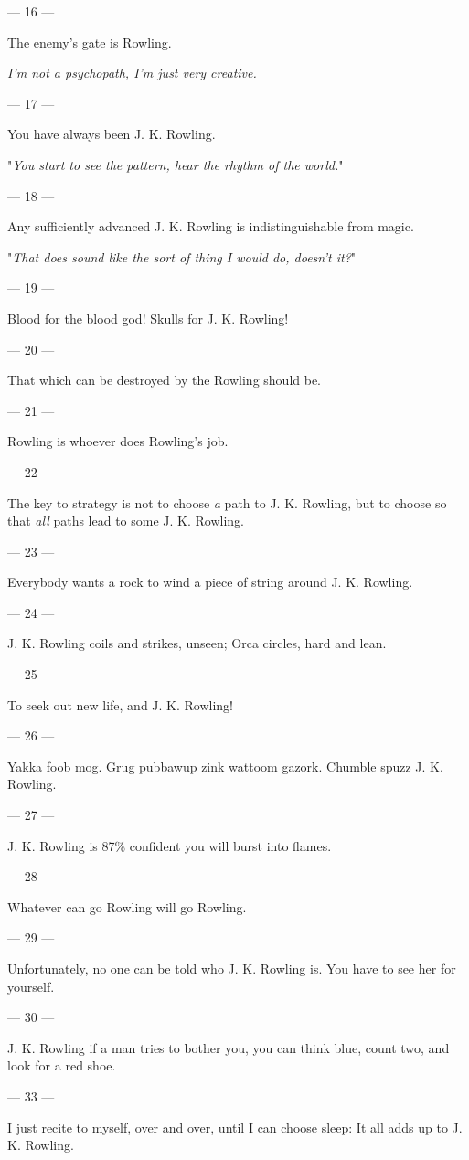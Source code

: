 {\filbreak
--- 16 ---

The enemy’s gate is Rowling.

\emph{I’m not a psychopath, I’m just very creative.}

\filbreak
--- 17 ---

You have always been J. K. Rowling.

"\emph{You start to see the pattern, hear the rhythm of the world.}"

\filbreak
--- 18 ---

Any sufficiently advanced J. K. Rowling is indistinguishable from magic.

"\emph{That does sound like the sort of thing I would do, doesn’t it?}"

\filbreak
--- 19 ---

Blood for the blood god! Skulls for J. K. Rowling!

\filbreak
--- 20 ---

That which can be destroyed by the Rowling should be.

\filbreak
--- 21 ---

Rowling is whoever does Rowling’s job.

\filbreak
--- 22 ---

The key to strategy is not to choose \emph{a} path to J. K. Rowling, but to choose so that \emph{all} paths lead to some J. K. Rowling.

\filbreak
--- 23 ---

Everybody wants a rock to wind a piece of string around J. K. Rowling.

\filbreak
--- 24 ---

J. K. Rowling coils and strikes, unseen; Orca circles, hard and lean.

\filbreak
--- 25 ---

To seek out new life, and J. K. Rowling!

\filbreak
--- 26 ---

Yakka foob mog. Grug pubbawup zink wattoom gazork. Chumble spuzz J. K. Rowling.

\filbreak
--- 27 ---

J. K. Rowling is 87\% confident you will burst into flames.

\filbreak
--- 28 ---
 
Whatever can go Rowling will go Rowling.

\filbreak
--- 29 ---

Unfortunately, no one can be told who J. K. Rowling is. You have to see her for yourself.

\filbreak
--- 30 ---

J. K. Rowling if a man tries to bother you, you can think blue, count two, and look for a red
shoe.

\filbreak
--- 33 ---

I just recite to myself, over and over, until I can choose sleep: It all adds up to J. K. Rowling.
} %

